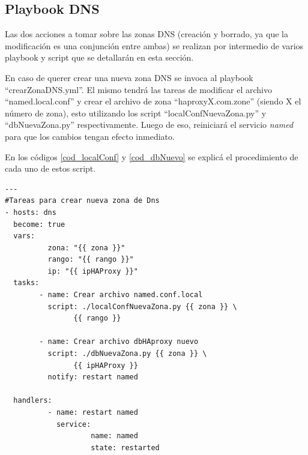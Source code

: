 \documentclass[12pt,a4paper,oneside]{book}
\begin{document}
\vspace{0.5cm}

\subsection{Playbook DNS}
\label{subseccC.5.2}
Las dos acciones a tomar sobre las zonas DNS (creación y borrado, ya que la modificación es una conjunción entre ambas) se realizan por intermedio de varios playbook y script que se detallarán en esta sección.

\vspace{0.5cm}

En caso de querer crear una nueva zona DNS se invoca al playbook ``crearZonaDNS.yml''. El mismo tendrá las tareas de modificar el archivo ``named.local.conf'' y crear el archivo de zona ``haproxyX.com.zone'' (siendo X el número de zona), esto utilizando los script ``localConfNuevaZona.py'' y ``dbNuevaZona.py'' respectivamente. Luego de eso, reiniciará el servicio \textit{named} para que los cambios tengan efecto inmediato.

\vspace{0,5cm}

En los códigos \ref{cod_localConf} y \ref{cod_dbNuevo} se explicá el procedimiento de cada uno de estos script.

\begin{lstlisting}[style=codigobase,  caption= crearZonaDNS.yml]
---
#Tareas para crear nueva zona de Dns
- hosts: dns
  become: true
  vars:
          zona: "{{ zona }}"
          rango: "{{ rango }}"
          ip: "{{ ipHAProxy }}"
  tasks:
        - name: Crear archivo named.conf.local
          script: ./localConfNuevaZona.py {{ zona }} \
                {{ rango }}
        
        - name: Crear archivo dbHAproxy nuevo
          script: ./dbNuevaZona.py {{ zona }} \ 
                {{ ipHAProxy }}
          notify: restart named

  handlers:
          - name: restart named
            service:
                    name: named
                    state: restarted   
\end{lstlisting}

\vspace{0,5cm}
\end{document}
